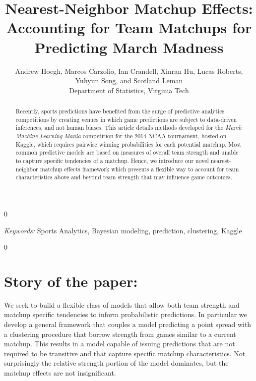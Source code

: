 \documentclass[letterpaper,12pt]{article}
\newcommand{\blind}{0}
\begin{document}
\blind
{
\title{Nearest-Neighbor Matchup Effects:  Accounting for Team Matchups for Predicting March Madness}
 \author{Andrew Hoegh, Marcos Carzolio, Ian Crandell, Xinran Hu, Lucas Roberts, \\Yuhyun Song, and Scotland Leman\\
 Department of Statistics, Virginia Tech}        
  \originalmaketitle
  \begin{abstract} 
\noindent
Recently, sports predictions have benefited from the surge of predictive analytics competitions by creating venues in which game predictions are subject to data-driven inferences, and not human biases. This article details methods developed for the \emph{March Machine Learning Mania} competition for the 2014 NCAA tournament, hosted on Kaggle, which requires pairwise winning probabilities for each potential matchup. Most common predictive models are based on measures of overall team strength and unable to capture specific tendencies of a matchup. Hence, we introduce our novel nearest-neighbor matchup effects framework which presents a flexible way to account for team characteristics above and beyond team strength that may influence game outcomes.
\end{abstract}

\noindent%
{\it Keywords:}  Sports Analytics, Bayesian modeling, prediction, clustering, Kaggle

} \fi

\blind
{
} \fi

\newpage



\section*{Story of the paper:}
  We seek to build a flexible class of models that allow both team strength and matchup specific tendencies to inform probabilistic predictions. In particular we develop a general framework that couples a model predicting a point spread with a clustering procedure that borrow strength from games similar to a current matchup. This results in a model capable of issuing predictions that are not required to be transitive and that capture specific matchup characteristics. Not surprisingly the relative strength portion of the model dominates, but the matchup effects are not insignificant.
\end{document}
